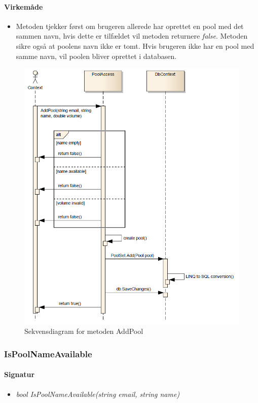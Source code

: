 \paragraph{Virkemåde}
\begin{itemize}
	\item Metoden tjekker først om brugeren allerede har oprettet en pool med det sammen navn, hvis dette er tilfældet vil metoden returnere \textit{false}. Metoden sikre også at poolens navn ikke er tomt. Hvis brugeren ikke har en pool med samme navn, vil poolen bliver oprettet i databasen.
\end{itemize}

\begin{figure}
\centering
\includegraphics[width=0.7\linewidth]{figs/dbSeq/addPool}
\caption{Sekvensdiagram for metoden AddPool}
\label{fig:addPool}
\end{figure}




\subsubsection{IsPoolNameAvailable}%






\paragraph{Signatur}
\begin{itemize}
	\item \textit{bool IsPoolNameAvailable(string email, string name)}
\end{itemize}


